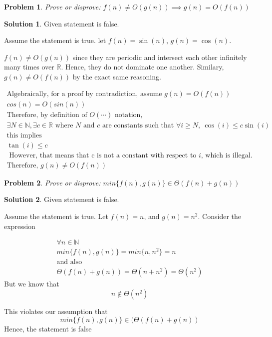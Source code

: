 \documentclass{article}
\newtheorem{problem}{Problem}
\theoremstyle{definition}
\newtheorem*{solution}{Solution}
\begin{document}
\begin{problem}
Prove or disprove: $f(n) \neq O(g(n)) \implies g(n) = O(f(n))$
\end{problem}
\begin{solution}
	Given statement is false.
	
	Assume the statement is true. let $f(n) = \sin(n)$, $g(n) = \cos(n)$.
	
	
	$f(n) \neq O(g(n))$ since they are periodic and intersect each other
	infinitely many times over $\mathbb R$. Hence, they do not dominate
	one another. Similary, $g(n) \neq O(f(n))$ by the exact same reasoning.
	    
	
	\begin{gather*}
		\text{Algebraically, for a proof by contradiction, assume } g(n) = O(f(n)) \\
		cos(n) = O(sin(n)) \\
		\text{Therefore, by definition of $O(\cdots)$ notation, } \\
		\exists N \in \mathbb N,
		\exists c \in \mathbb R
		\text{ where $N$ and $c$ are constants such that } 
		\forall i \geq N, \  \cos(i) \leq c \sin(i) \\
		\text{this implies} \\
		\tan(i) \leq c \\
		\text{ However, that means that c is not a constant with respect to $i$, which is illegal.} \\
		\text{Therefore, } g(n) \neq O(f(n))
	\end{gather*}
	
\end{solution}


\begin{problem}
Prove or disprove: $min \{ f(n), g(n) \} \in \Theta(f(n) + g(n))$
\end{problem}
\begin{solution}
	Given statement is false.
	
	Assume the statement is true. Let $f(n) = n$, and $g(n) = n^2$. Consider the expression
	
	\begin{gather*}
	\forall n \in \mathbb N \\
	min \{f(n), g(n) \} = min \{n, n^{2} \} = n \\
	\text{and also} \\
	\Theta(f(n) + g(n)) = \Theta(n + n^{2}) = \Theta(n^{2})
	\end{gather*}
But we know that
$$
n \notin \Theta(n^{2})
$$

This violates our assumption that 
$$
min \{ f(n), g(n) \} \in (\Theta(f(n) + g(n))
$$
Hence, the statement is false
\end{solution}
\end{document}
